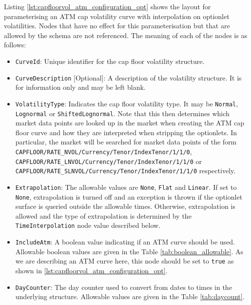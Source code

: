 Listing \ref{lst:capfloorvol_atm_configuration_opt} shows the layout for parameterising an ATM cap volatility curve with interpolation on optionlet volatilities. Nodes that have no effect for this parameterisation but that are allowed by the schema are not referenced. The meaning of each of the nodes is as follows:

\begin{itemize}
\item
\lstinline!CurveId!: Unique identifier for the cap floor volatility structure.

\item \lstinline!CurveDescription! [Optional]:
A description of the volatility structure. It is for information only and may be left blank.

\item \lstinline!VolatilityType!:
Indicates the cap floor volatility type. It may be \lstinline!Normal!, \lstinline!Lognormal! or \lstinline!ShiftedLognormal!. Note that this then determines which market data points are looked up in the market when creating the ATM cap floor curve and how they are interpreted when stripping the optionlets. In particular, the market will be searched for market data points of the form \lstinline!CAPFLOOR/RATE_NVOL/Currency/Tenor/IndexTenor/1/1/0!, \lstinline!CAPFLOOR/RATE_LNVOL/Currency/Tenor/IndexTenor/1/1/0! or \lstinline!CAPFLOOR/RATE_SLNVOL/Currency/Tenor/IndexTenor/1/1/0! respectively.

\item \lstinline!Extrapolation!:
The allowable values are \lstinline!None!, \lstinline!Flat! and \lstinline!Linear!. If set to \lstinline!None!, extrapolation is turned off and an exception is thrown if the optionlet surface is queried outside the allowable times. Otherwise, extrapolation is allowed and the type of extrapolation is determined by the \lstinline!TimeInterpolation! node value described below.

\item \lstinline!IncludeAtm!:
A boolean value indicating if an ATM curve should be used. Allowable boolean values are given in the Table \ref{tab:boolean_allowable}. As we are describing an ATM curve here, this node should be set to \lstinline!true! as shown in \ref{lst:capfloorvol_atm_configuration_opt}.

\item \lstinline!DayCounter!:
The day counter used to convert from dates to times in the underlying structure. Allowable values are given in the Table \ref{tab:daycount}.


\end{itemize}
